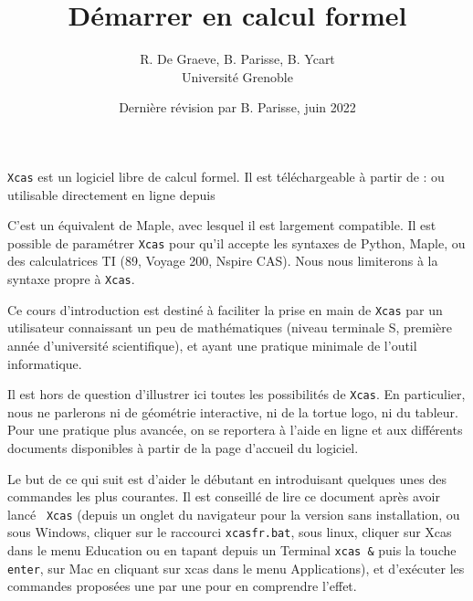 \documentclass{article}
\begin{document}
\title{D\'emarrer en calcul formel}
\author{R. De Graeve, B. Parisse, B. Ycart\\
Universit\'e Grenoble}
\date{Derni\`ere r\'evision par B. Parisse, juin 2022}

\begin{giacjshere}

\maketitle


{\tt Xcas} est un logiciel libre de calcul formel.
Il est t\'el\'echargeable \`a partir de :
ou utilisable directement en ligne depuis

C'est un \'equivalent de Maple, avec lesquel il est
largement compatible. Il est possible de param\'etrer {\tt Xcas} pour qu'il
accepte les syntaxes de Python, Maple, ou des calculatrices TI (89, Voyage 200, Nspire CAS).
Nous nous limiterons \`a la syntaxe propre \`a \verb|Xcas|. 

Ce cours d'introduction est destin\'e \`a faciliter la prise en main
de {\tt Xcas} par un utilisateur connaissant un peu de math\'ematiques
(niveau terminale S, premi\` ere ann\'ee d'universit\'e scientifique), 
et ayant une pratique minimale de l'outil informatique. 

Il est hors de question d'illustrer ici toutes les possibilit\'es 
de {\tt Xcas}. En particulier, nous ne parlerons ni de g\'eom\'etrie
interactive, ni de la tortue logo, ni du tableur. Pour une pratique plus
avanc\'ee, on se reportera \`a l'aide en ligne et aux diff\'erents
documents disponibles \`a partir de la page d'accueil du logiciel.
   
Le but de ce qui suit est d'aider le d\'ebutant en introduisant quelques unes 
des commandes les plus courantes. 
Il est conseill\'e de lire ce document apr\`es avoir lanc\'e {\tt
  Xcas} (depuis un onglet du navigateur pour la version sans installation, ou sous 
Windows, cliquer sur le raccourci {\tt xcasfr.bat}, sous linux, cliquer 
sur Xcas dans le menu Education ou en tapant depuis un Terminal {\tt xcas \&}
 puis la touche {\tt enter}, sur Mac en cliquant sur xcas dans le menu 
Applications), 
et d'ex\'ecuter les commandes propos\'ees une par une pour en 
comprendre l'effet. 


\tableofcontents


\end{giacjshere}
\end{document}
